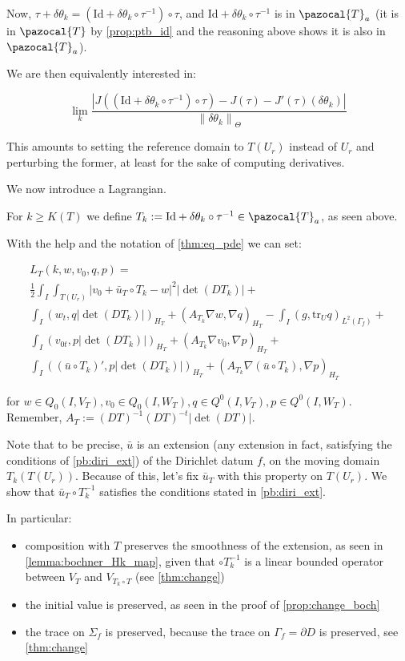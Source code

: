 \documentclass[english,a4paper,10pt,oneside]{scrbook}	%
\theoremstyle{break}
\theoremstyle{remark}
\newcommand{\norm}[1]{\left\lVert#1\right\rVert}
\newcommand{\tr}{\text{tr}}
\newcommand{\cT}{\pazocal{T}}
\newcommand{\id}{\text{Id}}
\newcommand{\te}{\theta}
\newcommand{\Te}{\Theta}
\begin{document}
Now, $\tau+\delta \te_k  = (\id+\delta\te_k \circ \tau^{-1})\circ \tau$, and $\id+\delta\te_k \circ \tau^{-1}$ is in $\cT_a$ (it is in $\cT$ by \cref{prop:ptb_id} and the reasoning above shows it is also in $\cT_a$).

We are then equivalently interested in:

$$\lim_{k}\frac{|J((\id+\delta\te_k \circ \tau^{-1})\circ \tau)-J(\tau)-J'(\tau)(\delta \te_k)|}{\norm{\delta \te_k}_{\Te}}$$

This amounts to setting the reference domain to $T(U_r)$ instead of $U_r$ and perturbing the former, at least for the sake of computing derivatives.

We now introduce a Lagrangian.

For $k\geq K(T)$ we define $T_k:=\id+\delta\te_k \circ \tau^{-1} \in \cT_a$, as seen above.

With the help and the notation of \cref{thm:eq_pde} we can set:

\begin{align*}
L_T(k,w,v_0,q,p) = \\
\frac{1}{2}\int_I \int_{T(U_r)}|v_0+\bar{u}_T\circ T_k - w|^2|\det(DT_k)|+\\
\int_I ( w_t , q |\det(DT_k)|)_{H_T}+ (A_{T_k}\nabla w, \nabla q)_{H_T} -\int_I(g,\tr_{U} q)_{L^2(\Gamma_f)} +\\ \int_I (v_{0t},p |\det(DT_k)|)_{H_T} + (A_{T_k} \nabla v_0, \nabla p)_{H_T}+\\\int_I((\bar{u}\circ T_k)',p|\det(DT_k)|)_{H_T}+(A_{T_k} \nabla (\bar{u} \circ T_k), \nabla p)_{H_T}
\end{align*}

for $w \in Q_0(I, V_T), v_0 \in Q_0(I,W_T), q \in Q^0(I, V_T), p \in Q^0(I, W_T)$. Remember,  $A_T:=  (DT)^{-1}(DT)^{-t}|\det(DT)|$.

Note that to be precise, $\bar{u}$ is an extension (any extension in fact, satisfying the conditions of \cref{pb:diri_ext}) of the Dirichlet datum $f$, on the moving domain $T_k(T(U_r))$. Because of this, let's fix $\bar{u}_T$ with this property on $T(U_r)$. We show that $\bar{u}_T\circ T_k^{-1}$ satisfies the conditions stated in \cref{pb:diri_ext}. 

In particular:

\begin{itemize}
	\item composition with $T$ preserves the smoothness of the extension, as seen in \cref{lemma:bochner_Hk_map}, given that $\circ T_k^{-1}$ is a linear bounded operator between $V_T$ and $V_{T_k \circ T}$ (see \ref{thm:change})
	\item the initial value is preserved, as seen in the proof of \cref{prop:change_boch}
	\item the trace on $\Sigma_f$ is preserved, because the trace on $\Gamma_f=\partial D$ is preserved, see \cref{thm:change}
\end{itemize}
\end{document}
